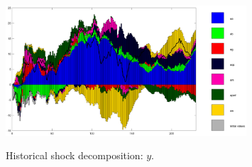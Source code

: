  
\begin{figure}[H]
\centering 
\includegraphics[width=0.8\textwidth]{SW/graphs/SW_shock_decomposition_y}
\label{Fig:shock_decomp:y}
\caption{Historical shock decomposition: $ y $.}
\end{figure}
 
 
